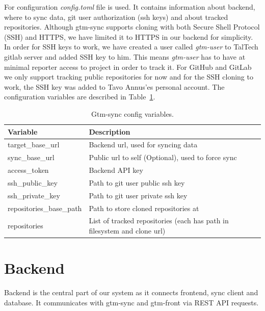 For configuration \textit{config.toml} file is used.
It contains information about backend, where to sync data, git user authorization (ssh keys) and about tracked repositories.
Although gtm-sync supports cloning with both Secure Shell Protocol (SSH) and HTTPS, we have limited it to HTTPS in our backend for simplicity.
In order for SSH keys to work, we have created a user called \textit{gtm-user} to TalTech gitlab server and added SSH key to him.
This means \textit{gtm-user} has to have at minimal reporter access to project in order to track it.
For GitHub and GitLab we only support tracking public repositories for now and for the SSH cloning to work, the SSH key was added to
Tavo Annus'es personal account.
The configuration variables are described in Table~\ref{tab:gtm-sync-config}.

\begin{table}[H]
    \centering
    \begin{tabular}{ | p{6cm} | p{6cm} |}
        \hline
        Variable & Description\\
        \hline
        target\_base\_url & Backend url, used for syncing data \\
        \hline
        sync\_base\_url &  Public url to self (Optional), used to force sync\\
        \hline
        access\_token & Backend API key\\
        \hline
        ssh\_public\_key & Path to git user public ssh key\\
        \hline
        ssh\_private\_key & Path to git user private ssh key\\
        \hline
        repositories\_base\_path & Path to store cloned repositories at\\
        \hline
        repositories & List of tracked repositories (each has path in filesystem and clone url)\\
        \hline
    \end{tabular}
    \caption{Gtm-sync config variables.}
    \label{tab:gtm-sync-config}
\end{table}

\section{Backend}\label{sec:backend-content}
Backend is the central part of our system as it connects frontend, sync client and database.
It communicates with gtm-sync and gtm-front via REST API requests.


